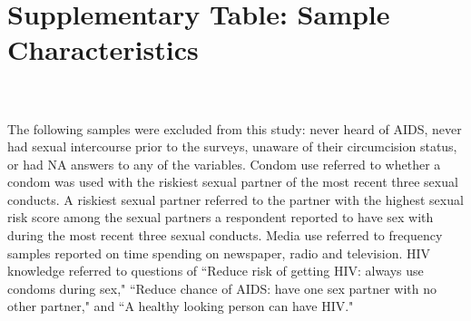 \documentclass[hidelinks,10pt,letterpaper]{article}
\date{}
\begin{document}
\section*{Supplementary Table: Sample Characteristics}

\setcounter{table}{0}
\renewcommand\thetable{\Alph{table}}


\begin{table}[H]

\caption{FGC table}
\\
\\
\textrm{The following samples were excluded from this study: never heard of AIDS, never had sexual intercourse prior to the surveys, unaware of their circumcision status, or had NA answers to any of the variables. Condom use referred to whether a condom was used with the riskiest sexual partner of the most recent three sexual conducts. A riskiest sexual partner referred to the partner with the highest sexual risk score among the sexual partners a respondent reported to have sex with during the most recent three sexual conducts.
Media use referred to frequency samples reported on time spending on newspaper, radio and television.
HIV knowledge referred to questions of ``Reduce risk of getting HIV: always use condoms during sex," ``Reduce chance of AIDS: have one sex partner with no other partner," and ``A healthy looking person can have HIV."}
\label{fgc_table}
\end{table}
\end{document}
